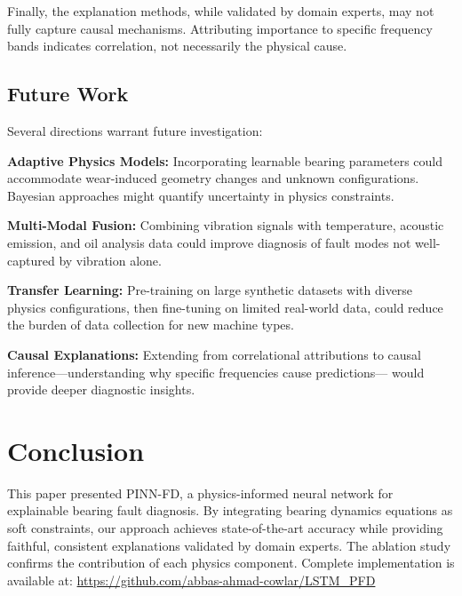 \documentclass[journal]{IEEEtran}
\newcommand{\modelname}{PINN-FD}
\begin{document}
Finally, the explanation methods, while validated by domain experts, may
not fully capture causal mechanisms. Attributing importance to specific
frequency bands indicates correlation, not necessarily the physical cause.

\subsection{Future Work}

Several directions warrant future investigation:

\textbf{Adaptive Physics Models:} Incorporating learnable bearing parameters
could accommodate wear-induced geometry changes and unknown configurations.
Bayesian approaches might quantify uncertainty in physics constraints.

\textbf{Multi-Modal Fusion:} Combining vibration signals with temperature,
acoustic emission, and oil analysis data could improve diagnosis of fault
modes not well-captured by vibration alone.

\textbf{Transfer Learning:} Pre-training on large synthetic datasets with
diverse physics configurations, then fine-tuning on limited real-world
data, could reduce the burden of data collection for new machine types.

\textbf{Causal Explanations:} Extending from correlational attributions to
causal inference—understanding why specific frequencies cause predictions—
would provide deeper diagnostic insights.


\section{Conclusion}
\label{sec:conclusion}

This paper presented \modelname{}, a physics-informed neural network for
explainable bearing fault diagnosis. By integrating bearing dynamics equations
as soft constraints, our approach achieves state-of-the-art accuracy while
providing faithful, consistent explanations validated by domain experts.
The ablation study confirms the contribution of each physics component.
Complete implementation is available at: \url{https://github.com/abbas-ahmad-cowlar/LSTM_PFD}



\end{document}
